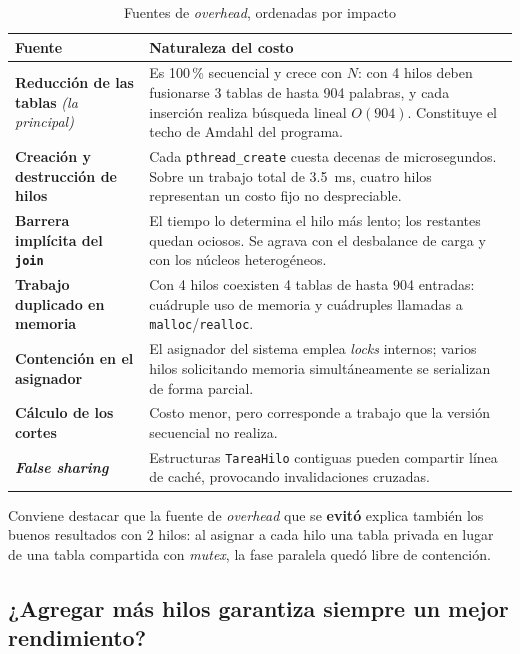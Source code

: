 \documentclass[11pt,letterpaper]{article}
\begin{document}
\begin{table}[H]
\centering
\caption{Fuentes de \emph{overhead}, ordenadas por impacto}
\small
\begin{tabular}{@{}p{4.3cm}p{10.2cm}@{}}
\toprule
\textbf{Fuente} & \textbf{Naturaleza del costo} \\
\midrule
\textbf{Reducción de las tablas} \newline \emph{(la principal)} &
  Es 100\,\% secuencial y crece con $N$: con 4 hilos deben fusionarse 3 tablas de
  hasta 904 palabras, y cada inserción realiza búsqueda lineal $O(904)$.
  Constituye el techo de Amdahl del programa. \\
\addlinespace
\textbf{Creación y destrucción de hilos} &
  Cada \texttt{pthread\_create} cuesta decenas de microsegundos. Sobre un trabajo
  total de 3.5~ms, cuatro hilos representan un costo fijo no despreciable. \\
\addlinespace
\textbf{Barrera implícita del \texttt{join}} &
  El tiempo lo determina el hilo más lento; los restantes quedan ociosos. Se
  agrava con el desbalance de carga y con los núcleos heterogéneos. \\
\addlinespace
\textbf{Trabajo duplicado en memoria} &
  Con 4 hilos coexisten 4 tablas de hasta 904 entradas: cuádruple uso de memoria
  y cuádruples llamadas a \texttt{malloc}/\texttt{realloc}. \\
\addlinespace
\textbf{Contención en el asignador} &
  El asignador del sistema emplea \emph{locks} internos; varios hilos solicitando
  memoria simultáneamente se serializan de forma parcial. \\
\addlinespace
\textbf{Cálculo de los cortes} &
  Costo menor, pero corresponde a trabajo que la versión secuencial no realiza. \\
\addlinespace
\textbf{\emph{False sharing}} &
  Estructuras \texttt{TareaHilo} contiguas pueden compartir línea de caché,
  provocando invalidaciones cruzadas. \\
\bottomrule
\end{tabular}
\end{table}

Conviene destacar que la fuente de \emph{overhead} que se \textbf{evitó} explica
también los buenos resultados con 2 hilos: al asignar a cada hilo una tabla
privada en lugar de una tabla compartida con \emph{mutex}, la fase paralela quedó
libre de contención.

\subsection{¿Agregar más hilos garantiza siempre un mejor rendimiento?}
\end{document}
